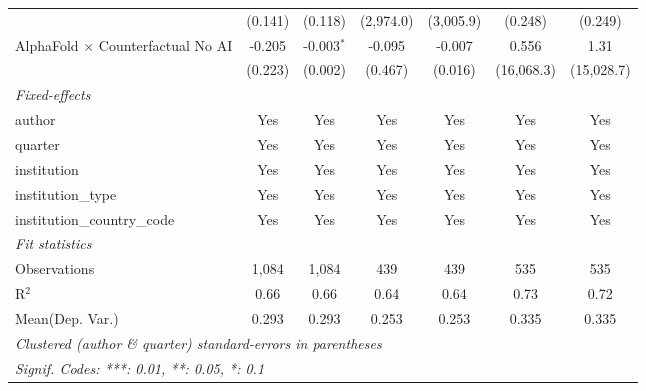 \begin{tabular}{lcccccc}
                                            & (0.141)       & (0.118)       & (2,974.0) & (3,005.9) & (0.248)    & (0.249)\\   
   AlphaFold $\times$ Counterfactual No AI  & -0.205        & -0.003$^{*}$  & -0.095    & -0.007    & 0.556      & 1.31\\   
                                            & (0.223)       & (0.002)       & (0.467)   & (0.016)   & (16,068.3) & (15,028.7)\\   
   \midrule
   \emph{Fixed-effects}\\
   author                                   & Yes           & Yes           & Yes       & Yes       & Yes        & Yes\\  
   quarter                                  & Yes           & Yes           & Yes       & Yes       & Yes        & Yes\\  
   institution                              & Yes           & Yes           & Yes       & Yes       & Yes        & Yes\\  
   institution\_type                        & Yes           & Yes           & Yes       & Yes       & Yes        & Yes\\  
   institution\_country\_code               & Yes           & Yes           & Yes       & Yes       & Yes        & Yes\\  
   \midrule
   \emph{Fit statistics}\\
   Observations                             & 1,084         & 1,084         & 439       & 439       & 535        & 535\\  
   R$^2$                                    & 0.66          & 0.66          & 0.64      & 0.64      & 0.73       & 0.72\\  
Mean(Dep. Var.) & 0.293 & 0.293 & 0.253 & 0.253 & 0.335 & 0.335 \\
   \midrule \midrule
   \multicolumn{7}{l}{\emph{Clustered (author \& quarter) standard-errors in parentheses}}\\
   \multicolumn{7}{l}{\emph{Signif. Codes: ***: 0.01, **: 0.05, *: 0.1}}\\
\end{tabular}
\par\endgroup
